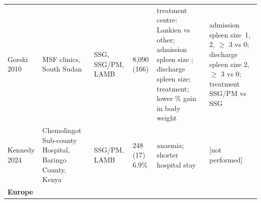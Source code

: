 {\begin{landscape}
\begin{ThreePartTable}
\begin{longtable}[c]{@{} L{3.1cm} L{2.5cm} L{2cm} L{1.7cm} L{6cm} L{6cm} @{}}
      \hspace{0.5em}Gorski 2010\cite{gorski2010}   & MSF clinics, South Sudan                                          & SSG, SSG/PM, LAMB                  & 8,090 (166) & treatment centre: Lankien\mtnote{****} vs other; admission spleen size \mtnote{***}; discharge spleen size\mtnote{***}; treatment\mtnote{****}; lower \% gain in body weight\mtnote{*}                                                                                                                                   & admission spleen size~1\mtnote{$\dagger$}, 2\mtnote{$\dagger$}, $\geq$ 3\mtnote{$\dagger$} vs 0; discharge spleen size 2\mtnote{$\dagger$}, $\geq$ 3\mtnote{$\dagger$} vs 0; treatment SSG/PM\mtnote{$\dagger$} vs SSG             \\
      \hspace{0.5em}Kennedy 2024\cite{kennedy2024} & Chemolingot Sub-county Hospital, Baringo County, Kenya            & SSG/PM, LAMB                       & 248 (17) 6.9\%       & anaemia\mtnote{*}; shorter hospital stay\mtnote{*}                                                                                                                                                                                                                                                                                & [not performed]                                                                                                                                                                                                                             \\
      \textbf{Europe}                              &                                                                   &                                    &                      &                                                                                                                                                                                                                                                                                                                                   &                                                                                                                                                                                                                                             \\

\end{longtable}
\end{ThreePartTable}
\end{landscape}}
